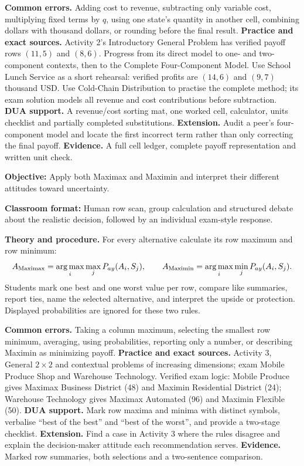 \documentclass[10pt,letterpaper]{article}
\newcommand{\labelled}[2]{\textbf{#1:} #2\par}
\newcommand{\partheading}[1]{\Needspace{6\baselineskip}\par\vspace{5pt}{\bfseries #1\par}\vspace{1pt}}
\begin{document}
\begin{bluebox}
		\textbf{Common errors.} Adding cost to revenue, subtracting only variable cost,
		multiplying fixed terms by $q$, using one state's quantity in another cell,
		combining dollars with thousand dollars, or rounding before the final result.
		\textbf{Practice and exact sources.} Activity 2's Introductory General Problem
		has verified payoff rows $(11,5)$ and $(8,6)$. Progress from its direct model to
		one- and two-component contexts, then to the Complete Four-Component Model.
		Use School Lunch Service as a short rehearsal: verified profits are
		$(14,6)$ and $(9,7)$ thousand USD. Use Cold-Chain Distribution to practise the
		complete method; its exam solution models all revenue and cost contributions
		before subtraction. \textbf{DUA support.} A revenue/cost sorting mat, one
		worked cell, calculator, units checklist and partially completed substitutions.
		\textbf{Extension.} Audit a peer's four-component model and locate the first
		incorrect term rather than only correcting the final payoff. \textbf{Evidence.}
		A full cell ledger, complete payoff representation and written unit check.
		
		\partheading{Part 4---C4: Decide Without Probabilities}
		\labelled{Objective}{Apply both Maximax and Maximin and interpret their different attitudes toward uncertainty.}
		\labelled{Classroom format}{Human row scan, group calculation and structured debate about the realistic decision, followed by an individual exam-style response.}
		\textbf{Theory and procedure.} For every alternative calculate its row maximum
		and row minimum:
		\[
		A_{\rm Maximax}=\operatorname*{arg\,max}_i\max_jP_{ay}(A_i,S_j),\qquad
		A_{\rm Maximin}=\operatorname*{arg\,max}_i\min_jP_{ay}(A_i,S_j).
		\]
		Students mark one best and one worst value per row, compare like summaries,
		report ties, name the selected alternative, and interpret the upside or
		protection. Displayed probabilities are ignored for these two rules.
		
		\textbf{Common errors.} Taking a column maximum, selecting the smallest row
		minimum, averaging, using probabilities, reporting only a number, or describing
		Maximin as minimizing payoff. \textbf{Practice and exact sources.} Activity 3,
		General $2\times2$ and contextual problems of increasing dimensions; exam
		Mobile Produce Shop and Warehouse Technology. Verified exam logic: Mobile
		Produce gives Maximax Business District (48) and Maximin Residential District
		(24); Warehouse Technology gives Maximax Automated (96) and Maximin Flexible
		(50). \textbf{DUA support.} Mark row maxima and minima with distinct symbols,
		verbalise ``best of the best'' and ``best of the worst'', and provide a
		two-stage checklist. \textbf{Extension.} Find a case in Activity 3 where the
		rules disagree and explain the decision-maker attitude each recommendation
		serves. \textbf{Evidence.} Marked row summaries, both selections and a
		two-sentence comparison.
		

\end{bluebox}
\end{document}
